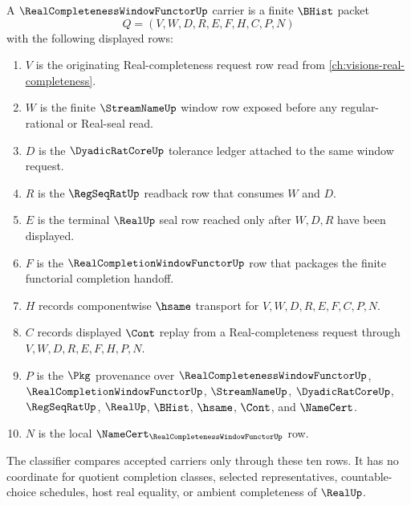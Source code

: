 \begin{definition}
\label{def:real-completeness-window-functor-carrier}
A $\RealCompletenessWindowFunctorUp$ carrier is a finite $\BHist$ packet
$$
Q=(V,W,D,R,E,F,H,C,P,N)
$$
with the following displayed rows:
\begin{enumerate}
\item $V$ is the originating Real-completeness request row read from \autoref{ch:visions-real-completeness}.
\item $W$ is the finite $\StreamNameUp$ window row exposed before any regular-rational or Real-seal read.
\item $D$ is the $\DyadicRatCoreUp$ tolerance ledger attached to the same window request.
\item $R$ is the $\RegSeqRatUp$ readback row that consumes $W$ and $D$.
\item $E$ is the terminal $\RealUp$ seal row reached only after $W,D,R$ have been displayed.
\item $F$ is the $\RealCompletionWindowFunctorUp$ row that packages the finite functorial completion handoff.
\item $H$ records componentwise $\hsame$ transport for $V,W,D,R,E,F,C,P,N$.
\item $C$ records displayed $\Cont$ replay from a Real-completeness request through $V,W,D,R,E,F,H,P,N$.
\item $P$ is the $\Pkg$ provenance over $\RealCompletenessWindowFunctorUp$, $\RealCompletionWindowFunctorUp$, $\StreamNameUp$, $\DyadicRatCoreUp$, $\RegSeqRatUp$, $\RealUp$, $\BHist$, $\hsame$, $\Cont$, and $\NameCert$.
\item $N$ is the local $\NameCert_{\RealCompletenessWindowFunctorUp}$ row.
\end{enumerate}
The classifier compares accepted carriers only through these ten rows. It has no coordinate for quotient completion classes, selected representatives, countable-choice schedules, host real equality, or ambient completeness of $\RealUp$.
\end{definition}

